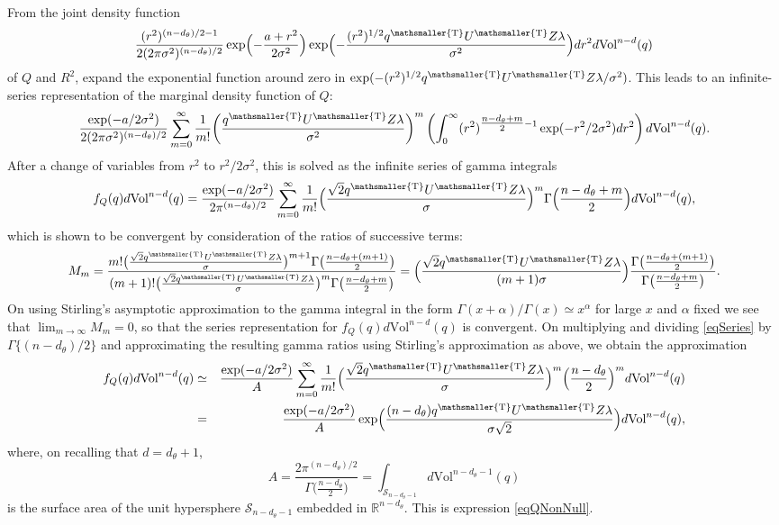 \documentclass[10pt, reqno]{amsart}
\numberwithin{equation}{section}
\newcommand{\RR}{\mathbb{R}}
\newcommand{\T}{{\mathsmaller {\rm T}}}
\begin{document}
\begin{appendix}
From the joint density function
\[
\frac{(r^2)^{(n-d_\theta)/2 -1}}{2(2\pi\sigma^2)^{(n-d_\theta)/2}} \exp\Bigl(-\frac{a+r^2}{2\sigma^2}\Bigr)\exp\Bigl(-\frac{(r^2)^{1/2}q^\T U^\T Z\lambda}{\sigma^2}\Bigr)dr^2 d \text{Vol}^{n-d}(q)
\]
of $Q$ and $R^2$, expand the exponential function around zero in $\exp(-(r^2)^{1/2}q^\T U^\T Z\lambda/\sigma^2)$. This leads to an infinite-series representation of the marginal density function of $Q$:
%
\begin{eqnarray*}
	\frac{\exp(-a/2\sigma^2)}{2(2\pi\sigma^2)^{(n-d_\theta)/2}} \sum_{m=0}^{\infty}\frac{1}{m!}\biggl(\frac{q^\T U^\T Z\lambda}{\sigma^2} \biggr)^m \left(\int_{0}^{\infty}(r^2)^{\tfrac{n-d_\theta+m}{2} - 1}\exp(-r^2/2\sigma^2)dr^2\right)d \text{Vol}^{n-d}(q).
\end{eqnarray*}
%
After a change of variables from $r^2$ to $r^2/2\sigma^2$, this is solved as the infinite series of gamma integrals
%
\begin{equation}\label{eqSeries}
	f_Q(q)d \text{Vol}^{n-d}(q)=\frac{\exp(-a/2\sigma^2)}{2\pi^{(n-d_\theta)/2}}\sum_{m=0}^{\infty}\frac{1}{m!}\Bigl(\frac{\sqrt{2} q^\T U^\T Z\lambda}{\sigma} \Bigr)^m \Gamma\Bigl(\frac{n-d_\theta+m}{2}\Bigr)d \text{Vol}^{n-d}(q),
\end{equation}
%
which is shown to be convergent by consideration of the ratios of successive terms:
\[
M_m=\frac{m!\bigl(\frac{\sqrt{2}q^\T U^\T Z\lambda}{\sigma} \bigr)^{m+1} \Gamma\bigl(\frac{n-d_\theta+(m+1)}{2}\bigr)}{(m+1)!\bigl(\frac{\sqrt{2} q^\T U^\T Z\lambda}{\sigma} \bigr)^m \Gamma\bigl(\frac{n-d_\theta+m}{2}\bigr)} = \Bigl(\frac{\sqrt{2}q^\T U^\T Z\lambda}{(m+1)\sigma}\Bigr)\frac{\Gamma\bigl(\frac{n-d_\theta+(m+1)}{2}\bigr)}{\Gamma\bigl(\frac{n-d_\theta+m}{2}\bigr)}.
\]
On using Stirling's asymptotic approximation to the gamma integral in the form $\Gamma(x+\alpha)/\Gamma(x)\simeq x^\alpha$ for large $x$ and $\alpha$ fixed we see that $\lim_{m\rightarrow \infty}M_m=0$, so that the series representation for $f_{Q}(q)d \text{Vol}^{n-d}(q)$ is convergent. On multiplying and dividing \eqref{eqSeries} by $\Gamma\{(n-d_\theta)/2\}$ and approximating the resulting gamma ratios using Stirling's approximation as above, we obtain the approximation
\begin{eqnarray*}
	\nonumber	f_Q(q)d \text{Vol}^{n-d}(q) &\simeq  & \frac{\exp(-a/2\sigma^2)}{A}\sum_{m=0}^{\infty}\frac{1}{m!}\Bigl(\frac{\sqrt{2} q^\T U^\T Z\lambda}{\sigma} \Bigr)^m \Bigl(\frac{n-d_\theta}{2}\Bigr)^m  d \text{Vol}^{n-d}(q) \\
	&=& \frac{\exp(-a/2\sigma^2)}{A}\exp\Bigl(\frac{(n-d_\theta) q^\T U^\T Z\lambda}{\sigma\sqrt{2}}\Bigr)d \text{Vol}^{n-d}(q),
\end{eqnarray*}
%
where, on recalling that $d=d_\theta +1$, 
\[
A=\frac{2\pi^{(n-d_\theta)/2}}{\Gamma\bigl(\frac{n-d_\theta}{2}\bigr)} = \int_{\mathcal{S}_{n-d_\theta - 1}} d \text{Vol}^{n-d_\theta - 1}(q)
\]
is the surface area of the unit hypersphere $\mathcal{S}_{n-d_\theta - 1}$ embedded in $\RR^{n-d_\theta}$. This is expression \eqref{eqQNonNull}.




\end{appendix}
\end{document}
